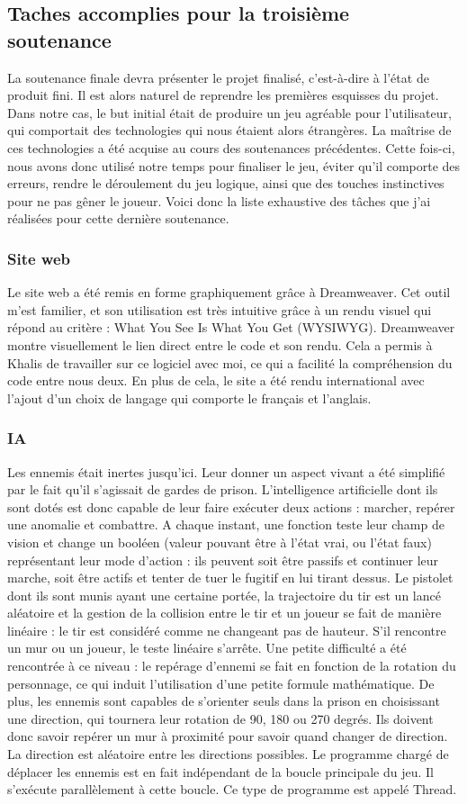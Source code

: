 \documentclass[12pt]{article}
\begin{document}
\subsection{Taches accomplies pour la troisième soutenance}
La soutenance finale devra présenter le projet finalisé, c'est-à-dire à l'état de produit fini. Il est alors naturel de reprendre les premières esquisses du projet.
Dans notre cas, le but initial était de produire un jeu agréable pour l'utilisateur, qui comportait des technologies qui nous étaient alors étrangères. La maîtrise de ces technologies a été acquise au cours des soutenances précédentes. Cette fois-ci, nous avons donc utilisé notre temps pour finaliser le jeu, éviter qu'il comporte des erreurs, rendre le déroulement du jeu logique, ainsi que des touches instinctives pour ne pas gêner le joueur. Voici donc la liste exhaustive des tâches que j'ai réalisées pour cette dernière soutenance.
\subsubsection {Site web} 
Le site web a été remis en forme graphiquement grâce à Dreamweaver. Cet outil m'est familier, et son utilisation est très intuitive grâce à un rendu visuel qui répond au critère : What You See Is What You Get (WYSIWYG). Dreamweaver montre visuellement le lien direct entre le code et son rendu. Cela a permis à Khalis de travailler sur ce logiciel avec moi, ce qui a facilité la compréhension du code entre nous deux. En plus de cela, le site a été rendu international avec l'ajout d'un choix de langage qui comporte le français et l'anglais.
\subsubsection {IA} 
Les ennemis était inertes jusqu'ici. Leur donner un aspect vivant a été simplifié par le fait qu'il s'agissait de gardes de prison. L'intelligence artificielle dont ils sont dotés est donc capable de leur faire exécuter deux actions : marcher, repérer une anomalie et combattre. A chaque instant, une fonction teste leur champ de vision et change un booléen (valeur pouvant être à l'état vrai, ou l'état faux) représentant leur mode d'action : ils peuvent soit être passifs et continuer leur marche, soit être actifs et tenter de tuer le fugitif en lui tirant dessus. Le pistolet dont ils sont munis ayant une certaine portée, la trajectoire du tir est un lancé aléatoire et la gestion de la collision entre le tir et un joueur se fait de manière linéaire : le tir est considéré comme ne changeant pas de hauteur. S'il rencontre un mur ou un joueur, le teste linéaire s'arrête. Une petite difficulté a été rencontrée à ce niveau : le repérage d'ennemi se fait en fonction de la rotation du personnage, ce qui induit l'utilisation d'une petite formule mathématique. De plus, les ennemis sont capables de s'orienter seuls dans la prison en choisissant une direction, qui tournera leur rotation de 90, 180 ou 270 degrés. Ils doivent donc savoir repérer un mur à proximité pour savoir quand changer de direction. La direction est aléatoire entre les directions possibles. Le programme chargé de déplacer les ennemis est en fait indépendant de la boucle principale du jeu. Il s'exécute parallèlement à cette boucle. Ce type de programme est appelé Thread.
\end{document}
